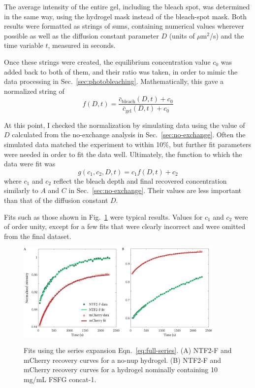 The average intensity of the entire gel, including the bleach spot, was determined in the same way, using the hydrogel mask instead of the bleach-spot mask.  Both results were formatted as strings of sums, containing numerical values wherever possible as well as the diffusion constant parameter $D$ (units of $\mu$m$^2$/s)  and the time variable $t$, measured in seconds.

Once these strings were created, the equilibrium concentration value $c_0$ was added back to both of them, and their ratio was taken, in order to mimic the data processing in Sec.~\ref{sec:photobleaching}.  Mathematically, this gave a normalized string of
\begin{equation}
f(D,t) = \frac{\bar{c}_\mathrm{bleach}(D,t)+c_0}{\bar{c}_\mathrm{gel}(D,t)+c_0}
\end{equation}

At this point, I checked the normalization by simulating data using the value of $D$ calculated from the no-exchange analysis in Sec.~\ref{sec:no-exchange}.  Often the simulated data matched the experiment to within 10\%, but further fit parameters were needed in order to fit the data well.  Ultimately, the function to which the data were fit was
\begin{equation}
g(c_1,c_2,D,t) = c_1f(D,t) + c_2
\end{equation}
where $c_1$ and $c_2$ reflect the bleach depth and final recovered concentration similarly to $A$ and $C$ in Sec.~\ref{sec:no-exchange}.  Their values are less important than that of the diffusion constant $D$.

Fits such as those shown in Fig.~\ref{fig:series-fits} were typical results.  Values for $c_1$ and $c_2$ were of order unity, except for a few fits that were clearly incorrect and were omitted from the final dataset.

\begin{figure}
\caption[Fits to recovery curves using Fourier transform solution.]{Fits using the series expansion Eqn.~\ref{eq:full-series}. (A) NTF2-F and mCherry recovery curves for a no-nup hydrogel.  (B) NTF2-F and mCherry recovery curves for a hydrogel nominally containing 10 mg/mL FSFG concat-1.}
\centering
\includegraphics[width=0.9\textwidth]{figs/ch04/series-fits.pdf}
\label{fig:series-fits}
\end{figure} 


